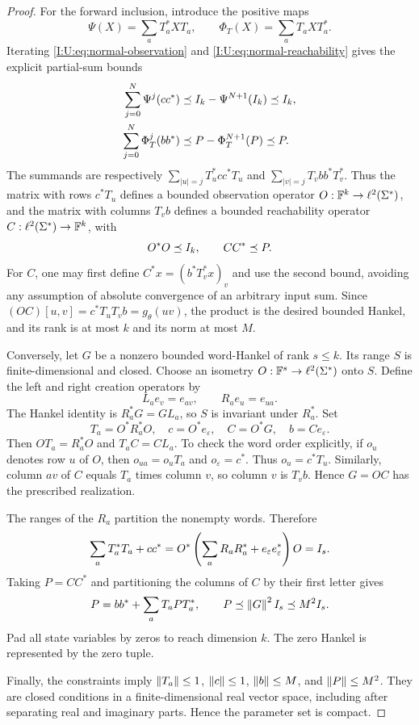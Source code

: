 \begin{proof}
For the forward inclusion, introduce the positive maps
\[
 \Psi(X)=\sum_aT_a^*XT_a,
 \qquad \Phi_T(X)=\sum_aT_aXT_a^*.
\]
Iterating \eqref{I:U:eq:normal-observation} and
\eqref{I:U:eq:normal-reachability} gives the explicit partial-sum bounds
\begin{align*}
 \sum_{j=0}^{N}\Psi^j(cc^*)
 &\preceq I_k-\Psi^{N+1}(I_k)\preceq I_k,\\
 \sum_{j=0}^{N}\Phi_T^j(bb^*)
 &\preceq P-\Phi_T^{N+1}(P)\preceq P.
\end{align*}
The summands are respectively
$\sum_{|u|=j}T_u^*cc^*T_u$ and
$\sum_{|v|=j}T_vbb^*T_v^*$. Thus the matrix with rows $c^*T_u$ defines a bounded observation operator $O:\mathbb F^k\to\ell^2(\Sigma^*)$, and the matrix with columns $T_vb$ defines a bounded reachability operator $C:\ell^2(\Sigma^*)\to\mathbb F^k$, with
\[
 O^*O\preceq I_k,\qquad CC^*\preceq P.
\]
For $C$, one may first define $C^*x=(b^*T_v^*x)_v$ and use the second bound, avoiding any assumption of absolute convergence of an arbitrary input sum. Since
$(OC)[u,v]=c^*T_uT_vb=g_\theta(uv)$, the product is the desired bounded Hankel, and its rank is at most $k$ and its norm at most $M$.

Conversely, let $G$ be a nonzero bounded word-Hankel of rank $s\le k$. Its range $S$ is finite-dimensional and closed. Choose an isometry
$O:\mathbb F^s\to\ell^2(\Sigma^*)$ onto $S$. Define the left and right creation operators by
\[
 L_ae_v=e_{av},\qquad R_ae_u=e_{ua}.
\]
The Hankel identity is $R_a^*G=GL_a$, so $S$ is invariant under $R_a^*$. Set
\[
 T_a=O^*R_a^*O,\quad c=O^*e_\varepsilon,
 \quad C=O^*G,\quad b=Ce_\varepsilon.
\]
Then $OT_a=R_a^*O$ and $T_aC=CL_a$. To check the word order explicitly, if $o_u$ denotes row $u$ of $O$, then $o_{ua}=o_uT_a$ and $o_\varepsilon=c^*$. Thus $o_u=c^*T_u$. Similarly, column $av$ of $C$ equals $T_a$ times column $v$, so column $v$ is $T_vb$. Hence $G=OC$ has the prescribed realization.

The ranges of the $R_a$ partition the nonempty words. Therefore
\[
 \sum_aT_a^*T_a+cc^*
 =O^*\left(\sum_aR_aR_a^*+e_\varepsilon e_\varepsilon^*\right)O
 =I_s.
\]
Taking $P=CC^*$ and partitioning the columns of $C$ by their first letter gives
\[
 P=bb^*+\sum_aT_aPT_a^*,\qquad
 P\preceq\left\lVert G\right\rVert^2I_s\preceq M^2I_s.
\]
Pad all state variables by zeros to reach dimension $k$. The zero Hankel is represented by the zero tuple.

Finally, the constraints imply
$\left\lVert T_a\right\rVert\le1$, $\left\lVert c\right\rVert\le1$, $\left\lVert b\right\rVert\le M$, and
$\left\lVert P\right\rVert\le M^2$. They are closed conditions in a finite-dimensional real vector space, including after separating real and imaginary parts. Hence the parameter set is compact.
\end{proof}
